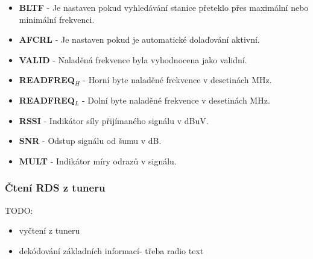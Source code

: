 \begin{itemize}
\item \textbf{BLTF} - Je nastaven pokud vyhledávání stanice přeteklo přes maximální nebo minimální frekvenci.
\item \textbf{AFCRL} - Je nastaven pokud je automatické dolaďování aktivní.
\item \textbf{VALID} - Naladěná frekvence byla vyhodnocena jako validní. 
\item \textbf{READFREQ$_{{H}}$} - Horní byte naladěné frekvence v desetinách MHz.
\item \textbf{READFREQ$_{{L}}$} - Dolní byte naladěné frekvence v desetinách MHz.
\item \textbf{RSSI} - Indikátor síly přijímaného signálu v dBuV. %
\item \textbf{SNR} - Odstup signálu od šumu v dB.
\item \textbf{MULT} - Indikátor míry odrazů v signálu.
\end{itemize}


\subsubsection{Čtení RDS z tuneru}
TODO:
\begin{itemize}
\item vyčtení z tuneru
\item dekódování základních informací- třeba radio text
\end{itemize}